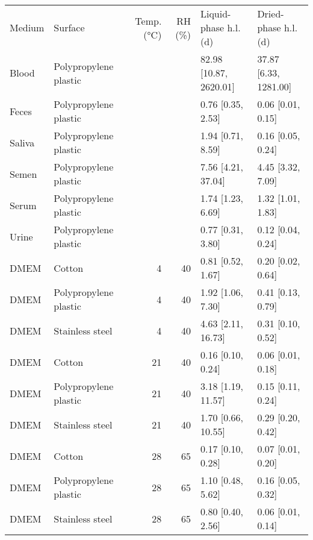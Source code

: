 \begin{tabular}{llrrll}
Medium & Surface & Temp. (\si{\celsius}) & RH (\si{\%}) & Liquid-phase h.l. (\si{\day}) & Dried-phase h.l. (\si{\day}) \\
Blood & Polypropylene plastic &  &  & 82.98 [10.87, 2620.01] & 37.87 [6.33, 1281.00] \\
Feces & Polypropylene plastic &  &  & 0.76 [0.35, 2.53] & 0.06 [0.01, 0.15] \\
Saliva & Polypropylene plastic &  &  & 1.94 [0.71, 8.59] & 0.16 [0.05, 0.24] \\
Semen & Polypropylene plastic &  &  & 7.56 [4.21, 37.04] & 4.45 [3.32, 7.09] \\
Serum & Polypropylene plastic &  &  & 1.74 [1.23, 6.69] & 1.32 [1.01, 1.83] \\
Urine & Polypropylene plastic &  &  & 0.77 [0.31, 3.80] & 0.12 [0.04, 0.24] \\
DMEM & Cotton & 4 & 40 & 0.81 [0.52, 1.67] & 0.20 [0.02, 0.64] \\
DMEM & Polypropylene plastic & 4 & 40 & 1.92 [1.06, 7.30] & 0.41 [0.13, 0.79] \\
DMEM & Stainless steel & 4 & 40 & 4.63 [2.11, 16.73] & 0.31 [0.10, 0.52] \\
DMEM & Cotton & 21 & 40 & 0.16 [0.10, 0.24] & 0.06 [0.01, 0.18] \\
DMEM & Polypropylene plastic & 21 & 40 & 3.18 [1.19, 11.57] & 0.15 [0.11, 0.24] \\
DMEM & Stainless steel & 21 & 40 & 1.70 [0.66, 10.55] & 0.29 [0.20, 0.42] \\
DMEM & Cotton & 28 & 65 & 0.17 [0.10, 0.28] & 0.07 [0.01, 0.20] \\
DMEM & Polypropylene plastic & 28 & 65 & 1.10 [0.48, 5.62] & 0.16 [0.05, 0.32] \\
DMEM & Stainless steel & 28 & 65 & 0.80 [0.40, 2.56] & 0.06 [0.01, 0.14] \\
\end{tabular}
